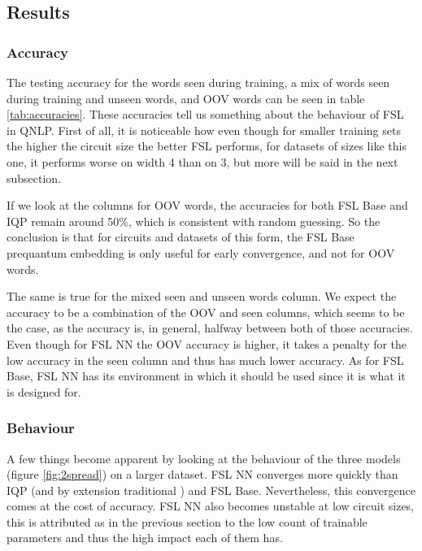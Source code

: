 \subsection{Results}
\subsubsection{Accuracy}

The testing accuracy for the words seen during training, a mix of words seen during training and unseen words, and OOV words can be seen in table \ref{tab:accuracies}. These accuracies tell us something about the behaviour of FSL in QNLP. First of all, it is noticeable how even though for smaller training sets the higher the circuit size the better FSL performs, for datasets of sizes like this one, it performs worse on width 4 than on 3, but more will be said in the next subsection.

If we look at the columns for OOV words, the accuracies for both FSL Base and IQP remain around 50\%, which is consistent with random guessing. So the conclusion is that for circuits and datasets of this form, the FSL Base prequantum embedding is only useful for early convergence, and not for OOV words.

The same is true for the mixed seen and unseen words column. We expect the accuracy to be a combination of the OOV and seen columns, which seems to be the case, as the accuracy is, in general, halfway between both of those accuracies. Even though for FSL NN the OOV accuracy is higher, it takes a penalty for the low accuracy in the seen column and thus has much lower accuracy. As for FSL Base, FSL NN has its environment in which it should be used since it is what it is designed for. 





\subsubsection{Behaviour}
A few things become apparent by looking at the behaviour of the three models (figure \ref{fig:2spread}) on a larger dataset. FSL NN converges more quickly than IQP (and by extension traditional \mya) and FSL Base. Nevertheless, this convergence comes at the cost of accuracy. FSL NN also becomes unstable at low circuit sizes, this is attributed as in the previous section to the low count of trainable parameters and thus the high impact each of them has.

